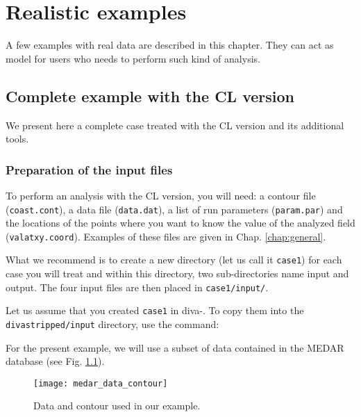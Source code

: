 \chapter{Realistic examples\label{chap:examples}}
\lettrine[lines=2, loversize=-0.1, lraise=0.1]{A}{} few examples with real data are described in this chapter. They can act as model for users who needs to perform such kind of analysis. 

\minitoc

\newpage

\section{Complete example with the CL version}

We present here a complete case treated with the CL version and its additional tools.


\subsection{Preparation of the input files\label{prep}}

To perform an analysis with the CL version, you will need: a contour file (\texttt{coast.cont}), a data file (\texttt{data.dat}), a list of run parameters (\texttt{param.par}) and the locations of the points where you want to know the value of the analyzed field (\texttt{valatxy.coord}). Examples of these files are given in Chap. \ref{chap:general}.

What we recommend is to create a new directory (let us call it \texttt{case1}) for each case you will treat and within this directory, two sub-directories name input and output. The four input files are then placed in \texttt{case1/input/}. 

Let us assume that you created \texttt{case1} in diva-\divaversion. To copy them into the \texttt{diva\-stripped/\-input} directory, use the command: 

\vspace{.25cm}


For the present example, we will use a subset of data contained in the MEDAR database (see Fig. \ref{dataplotCL}). 

\begin{figure}[htpb]
\centering
\parbox{.65\textwidth}{
\texttt{[image: medar\_data\_contour]}
}\parbox{.35\textwidth}{
\caption{Data and contour used in our example.\label{dataplotCL}}
}
\end{figure}


